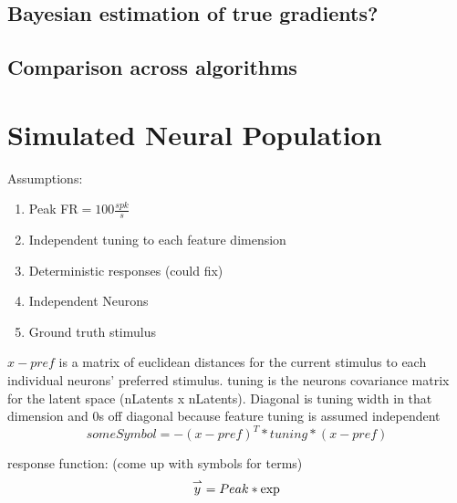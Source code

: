 \subsection{Bayesian estimation of true gradients?}
\subsection{Comparison across algorithms}

\section{Simulated Neural Population}
Assumptions:
\begin{enumerate}
	\item Peak FR$= 100 \frac{spk}{s}$
	\item Independent tuning to each feature dimension
	\item Deterministic responses (could fix)
	\item Independent Neurons
	\item Ground truth stimulus
\end{enumerate}

$x-pref$ is a matrix of euclidean distances for the current stimulus to each individual neurons' preferred stimulus. tuning is the neurons covariance matrix for the latent space (nLatents x nLatents). Diagonal is tuning width in that dimension and 0s off diagonal because feature tuning is assumed independent
\begin{equation}
someSymbol = -(x-pref)^T * tuning * (x-pref)
\end{equation}

response function: (come up with symbols for terms)
\begin{equation}
	\overset{\rightharpoonup} y = Peak * \exp{}
\end{equation}





 